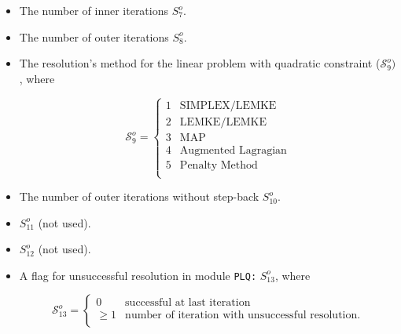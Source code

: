 \begin{itemize}
\item The number of inner iterations ${S}^{o}_{7}$.
\item The number of outer iterations ${S}^{o}_{8}$.
\item The resolution's method for the linear problem with quadratic constraint ($\mathcal{S}^{o}_{9})$, where

\begin{displaymath}
\mathcal{S}^{o}_{9} = \left\{
\begin{array}{rl}
 1 & \textrm{SIMPLEX/LEMKE} \\
 2 & \textrm{LEMKE/LEMKE} \\
 3 & \textrm{MAP} \\
 4 & \textrm{Augmented Lagragian} \\
 5 & \textrm{Penalty Method} \\
\end{array} \right.
\end{displaymath}

\item The number of outer iterations without step-back ${S}^{o}_{10}$.
\item ${S}^{o}_{11}$ (not used).
\item ${S}^{o}_{12}$ (not used).

\item A flag for unsuccessful resolution in module {\tt PLQ:} ${S}^{o}_{13}$, where

\begin{displaymath}
\mathcal{S}^{o}_{13} = \left\{
\begin{array}{rl}
 0 & \textrm{successful at last iteration} \\
 \ge 1 & \textrm{number of iteration with unsuccessful resolution.} \\
\end{array} \right.
\end{displaymath}

\end{itemize}


